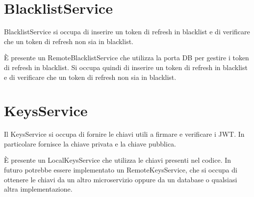 \section{BlacklistService}

BlacklistService si occupa di inserire un token di refresh in blacklist e di verificare che un token di refresh non sia in blacklist.

È presente un RemoteBlacklistService che utilizza la porta DB per gestire i token di refresh in blacklist. Si occupa quindi di inserire un token di refresh in blacklist e di verificare che un token di refresh non sia in blacklist.

\section{KeysService}

Il KeysService si occupa di fornire le chiavi utili a firmare e verificare i JWT. In particolare fornisce la chiave privata e la chiave pubblica.

È presente un LocalKeysService che utilizza le chiavi presenti nel codice. In futuro potrebbe essere implementato un RemoteKeysService, che si occupa di ottenere le chiavi da un altro microservizio oppure da un database o qualsiasi altra implementazione.
